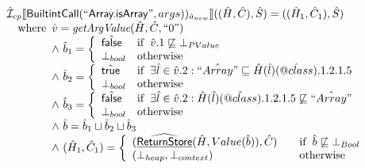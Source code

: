 \[\begin{array}{l}
\aI _{cp}\lbr \SF{BuiltintCall}(``\SF{Array.isArray}",args))_{\hat{a}_{new}}\rbr((\hat{H},\hat{C}), \hat{S})
  = ((\hat{H}_1, \hat{C}_1), \hat{S})\\
\quad\wherec{
  \hat{v} = \hf{getArgValue}(\hat{H}, \hat{C}, ``0")\\
  \land\ \hat{b}_1 = \left\{\begin{array}{ll}
      \afalse & \ifc{\hat{v}.1 \not\sqsubseteq \bot_{PValue}}\\
      \bot_{bool}& \owc
    \end{array}\right.\\
  \land\ \hat{b}_2 = \left\{\begin{array}{ll}
      \atrue & \ifc{\exists \hat{l} \in \hat{v}.2 : \hat{``Array"} \sqsubseteq \hat{H}(\hat{l})(\avarprop{class}).1.2.1.5}\\
      \bot_{bool}& \owc
    \end{array}\right.\\
  \land\ \hat{b}_3 = \left\{\begin{array}{ll}
      \afalse & \ifc{\exists\hat{l} \in \hat{v}.2 : \hat{H}(\hat{l})(\avarprop{class}).1.2.1.5 \not\sqsubseteq \hat{``Array"} }\\
      \bot_{bool}& \owc
    \end{array}\right.\\
  \land\ \hat{b} = \hat{b}_1 \sqcup \hat{b}_2 \sqcup \hat{b}_3\\
  \land\ (\hat{H}_1, \hat{C}_1) = 
    \left\{\begin{array}{l@{\quad\quad}l}
      (\ahf{ReturnStore}(\hat{H}, Value(\hat{b})), \hat{C})
      & \ifc{\hat{b} \not\sqsubseteq \bot_{Bool}}\\
      (\bot_{heap}, \bot_{context}) & \owc \\
    \end{array}\right.\\
  }\\	
\\\\


\end{array}
\]


